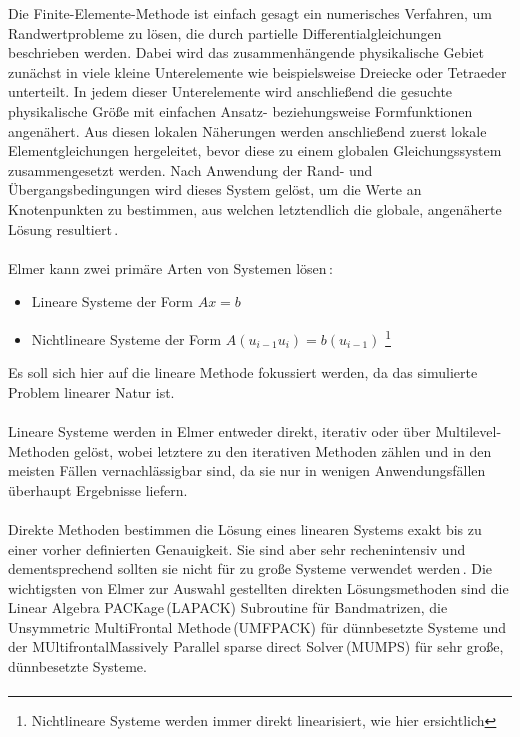 \documentclass[12pt, a4paper]{article}
\begin{document}
Die Finite-Elemente-Methode ist einfach gesagt ein numerisches Verfahren, um Randwertprobleme zu lösen, die durch partielle Differentialgleichungen beschrieben werden. \newline
Dabei wird das zusammenhängende physikalische Gebiet zunächst in viele kleine Unterelemente wie beispielsweise Dreiecke oder Tetraeder unterteilt. In jedem dieser Unterelemente wird anschließend die gesuchte physikalische Größe mit einfachen Ansatz- beziehungsweise Formfunktionen angenähert. Aus diesen lokalen Näherungen werden anschließend zuerst lokale Elementgleichungen hergeleitet, bevor diese zu einem globalen Gleichungssystem zusammengesetzt werden. Nach Anwendung der Rand- und Übergangsbedingungen wird dieses System gelöst, um die Werte an Knotenpunkten zu bestimmen, aus welchen letztendlich die globale, angenäherte Lösung resultiert\,\cite{sukumar07}.\paragraph{}

Elmer kann zwei primäre Arten von Systemen lösen\,\cite{elmerSolve}:
\begin{itemize}
	\item Lineare Systeme der Form $Ax=b$
	\item Nichtlineare Systeme der Form $A(u_{i-1}u_i)=b(u_{i-1})$ \footnote{Nichtlineare Systeme werden immer direkt linearisiert, wie hier ersichtlich}
\end{itemize}
Es soll sich hier auf die lineare Methode fokussiert werden, da das simulierte Problem linearer Natur ist.\paragraph{}

Lineare Systeme werden in Elmer entweder direkt, iterativ oder über Multilevel-Methoden gelöst, wobei letztere zu den iterativen Methoden zählen und in den meisten Fällen vernachlässigbar sind, da sie nur in wenigen Anwendungsfällen überhaupt Ergebnisse liefern.\paragraph{}

Direkte Methoden bestimmen die Lösung eines linearen Systems exakt bis zu einer vorher definierten Genauigkeit. Sie sind aber sehr rechenintensiv und dementsprechend sollten sie nicht für zu große Systeme verwendet werden\,\cite{elmerSolve}.\newline
Die wichtigsten von Elmer zur Auswahl gestellten direkten Lösungsmethoden sind die Linear Algebra PACKage\,(LAPACK) Subroutine für Bandmatrizen, die Unsymmetric \newline MultiFrontal Methode\,(UMFPACK) für dünnbesetzte Systeme und der MUltifrontal\newline Massively Parallel sparse direct Solver\,(MUMPS) für sehr große, dünnbesetzte Systeme.\paragraph{}
\end{document}
